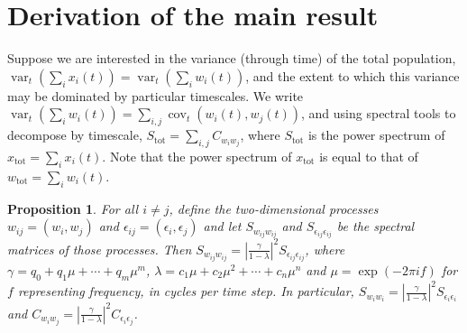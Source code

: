 \documentclass[letterpaper,11pt]{article}
\newcommand{\var}{{\operatorname{var}}}
\newcommand{\cov}{{\operatorname{cov}}}
\newtheorem{proposition}[theorem]{Proposition}
\begin{document}
\section{Derivation of the main result}

Suppose we are interested in the variance (through time) of the
total population, $\var_t(\sum_i x_i(t)) = \var_t(\sum_i w_i(t))$,
and the extent to which this variance may be dominated by particular timescales.
We write $\var_t(\sum_i w_i(t))=\sum_{i,j} \cov_t(w_i(t),w_j(t))$,
and using spectral tools to decompose by timescale,
$S_{\text{tot}} = \sum_{i,j} C_{w_i w_j}$, where $S_{\text{tot}}$
is the power spectrum of $x_{\text{tot}} = \sum_i x_i(t)$. Note that
the power spectrum of $x_{\text{tot}}$ is equal to that of 
$w_{\text{tot}}=\sum_i w_i(t)$. 

\begin{proposition}
For all $i \neq j$, define the two-dimensional processes 
$w_{ij}=(w_i,w_j)$ and $\epsilon_{ij} = (\epsilon_{i},\epsilon_{j})$ and 
let $S_{w_{ij} w_{ij}}$ and $S_{\epsilon_{ij}\epsilon_{ij}}$ be the spectral
matrices of those processes. Then
$S_{w_{ij} w_{ij}} = \left| \frac{\gamma}{1-\lambda} \right|^2 S_{\epsilon_{ij}\epsilon_{ij}}$, where $\gamma=q_{ 0}+q_{ 1}\mu+\cdots+q_{m}\mu^{m}$,
$\lambda=c_{ 1 }\mu+c_{ 2}\mu^{2}+\cdots+c_{n}\mu^{n}$ and $\mu=\exp(-2\pi i f)$
for $f$ representing frequency, in cycles per time step. In particular,
$S_{w_i w_i} = \left| \frac{\gamma}{1-\lambda} \right|^2 S_{\epsilon_{i}\epsilon_{i}}$ 
and $C_{w_i w_j} = \left| \frac{\gamma}{1-\lambda} \right|^2 C_{\epsilon_{i}\epsilon_{j}}$.
\end{proposition}
\end{document}
